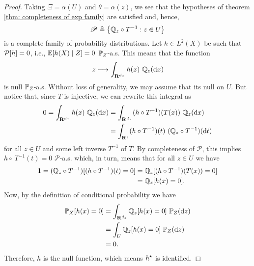 \begin{proof}
    Taking $ \Xi = \alpha ( U ) $ and $ \theta = \alpha ( z ) $, we see that the hypotheses of theorem \ref{thm: completeness of exp family} are satisfied and, hence,
    \begin{equation*}
        \mathscr{P} \triangleq \left\{ \mathbb{Q}_{ z } \circ T^{ -1 } : z \in U \right\}
    \end{equation*}
    is a complete family of probability distributions.
    Let $ h \in L^2 ( X ) $ be such that $ \mathcal{P} [ h ] = 0 $, i.e., $ \mathbb{E} [ h ( X ) \mid Z ] = 0 $ $ \mathbb{P}_{ Z } $-a.s.
    This means that the function
    \begin{equation*}
        z \longmapsto \int_{ \mathbf{R}^{ d_{ x } } } h ( x ) \ \mathbb{Q}_{ z } ( \mathrm{d} x )
    \end{equation*}
    is null $ \mathbb{P}_{ Z } $-a.s.
    Without loss of generality, we may assume that its null on $ U $.
    But notice that, since $ T $ is injective, we can rewrite this integral as
    \begin{align*}
        0 = \int_{ \mathbf{R}^{ d_{ x } } } h ( x ) \ \mathbb{Q}_{ z } ( \mathrm{d} x )
        &= \int_{ \mathbf{R}^{ d_{ x } } } ( h \circ T^{ -1 } ) ( T ( x ) ) \ \mathbb{Q}_{ z } ( \mathrm{d} x ) \\
        &= \int_{ \mathbf{R}^{ s } } ( h \circ T^{ -1 } ) ( t )  \ ( \mathbb{Q}_{ z } \circ T^{ -1 } ) ( \mathrm{d} t )
    \end{align*}
    for all $ z \in U $ and some left inverse $ T^{ -1 } $ of $ T $.
    By completeness of $ \mathscr{P} $, this implies $ h \circ~T^{ -1 } ( t ) = 0 $ $ \mathscr{P} $-a.s. which, in turn, means that for all $ z \in U $ we have
    \begin{align*}
        1 = ( \mathbb{Q}_{ z } \circ T^{ -1 } ) [ ( h \circ T^{ -1 } ) ( t ) = 0 ]
        &= \mathbb{Q}_{ z } [ ( h \circ T^{ -1 } ) ( T ( x ) ) = 0 ] \\
        &= \mathbb{Q}_{ z } [ h ( x ) = 0 ]
    .\end{align*}
    Now, by the definition of conditional probability we have
    \begin{align*}
        \prob_{ X } [ h ( x ) = 0 ]
        &= \int_{ \R^{ d_{ z } } } \probq_{ z } [ h ( x ) = 0 ] \ \prob_{ Z } ( \ddrm z ) \\
        &= \int_{ U } \probq_{ z } [ h ( x ) = 0 ] \ \prob_{ Z } ( \ddrm z ) \\
        &= 0
    .\end{align*}
    Therefore, $ h $ is the null function, which means $ h^{ \star } $ is identified.
\end{proof}
